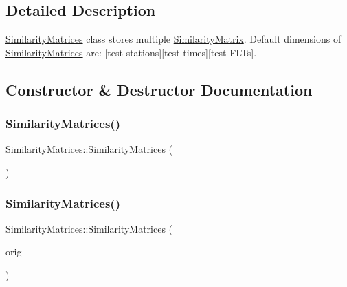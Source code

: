 \subsection{Detailed Description}
\mbox{\hyperlink{class_similarity_matrices}{Similarity\+Matrices}} class stores multiple \mbox{\hyperlink{class_similarity_matrix}{Similarity\+Matrix}}. Default dimensions of \mbox{\hyperlink{class_similarity_matrices}{Similarity\+Matrices}} are\+: \mbox{[}test stations\mbox{]}\mbox{[}test times\mbox{]}\mbox{[}test F\+L\+Ts\mbox{]}. 

\subsection{Constructor \& Destructor Documentation}
\mbox{\label{class_similarity_matrices_a4dc7fe147a9c1ac927a11918f206a306}} 
\subsubsection{\texorpdfstring{Similarity\+Matrices()}{SimilarityMatrices()}\hspace{0.1cm}{\footnotesize\ttfamily [1/3]}}
{\footnotesize\ttfamily Similarity\+Matrices\+::\+Similarity\+Matrices (\begin{DoxyParamCaption}{ }\end{DoxyParamCaption})\hspace{0.3cm}{\ttfamily [delete]}}

\mbox{\label{class_similarity_matrices_a915fa9a5b1906a6e48a102be543de8b2}} 
\subsubsection{\texorpdfstring{Similarity\+Matrices()}{SimilarityMatrices()}\hspace{0.1cm}{\footnotesize\ttfamily [2/3]}}
{\footnotesize\ttfamily Similarity\+Matrices\+::\+Similarity\+Matrices (\begin{DoxyParamCaption}\item[{const \mbox{\hyperlink{class_similarity_matrices}{Similarity\+Matrices}} \&}]{orig }\end{DoxyParamCaption})\hspace{0.3cm}{\ttfamily [delete]}}

